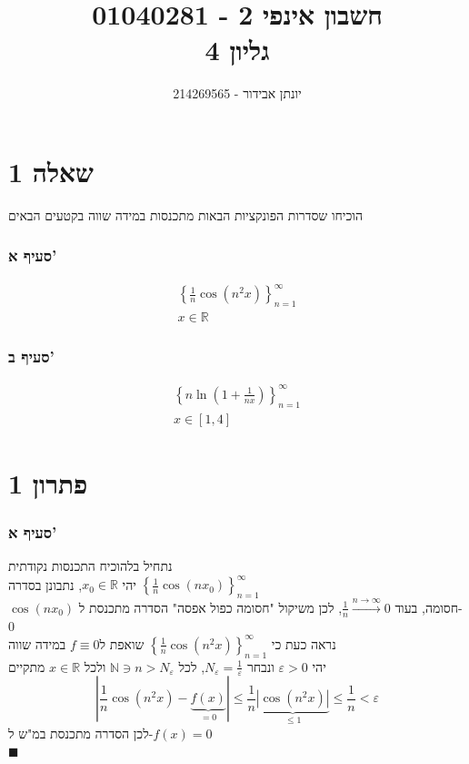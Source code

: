 \documentclass[12pt, titlepage]{article}
\title{חשבון אינפי 2 - 01040281 \\ גליון 4}
\author{יונתן אבידור - 214269565}
\begin{document}
\maketitle
\pagestyle{fancy}
\fancyhead{}
\part*{שאלה 1}
הוכיחו שסדרות הפונקציות הבאות מתכנסות במידה שווה בקטעים הבאים
\section*{סעיף א'}
\begin{gather*} \left\{\frac{1}{n} \cos \left(n^2x\right) \right\}^\infty_{n=1}\\
    x \in \mathbb{R}
\end{gather*}
\section*{סעיף ב'}
\begin{gather*}
    \left\{n\ln \left(1+\frac{1}{nx}\right)\right\}^\infty_{n=1}\\
    x\in\left[1,4\right]
\end{gather*}
\part*{פתרון 1}
\section*{סעיף א'}
נתחיל בלהוכיח התכנסות נקודתית\\
יהי $x_0 \in \mathbb{R}$, נתבונן בסדרה $\left\{\frac{1}{n} \cos\left(n x_0\right)\right\}_{n=1}^{\infty}$ \\
$\cos\left(n x_0\right)$ חסומה, בעוד $\frac{1}{n} \xrightarrow{n\to\infty}0$, לכן משיקול "חסומה כפול אפסה" הסדרה מתכנסת ל-$0$\\
נראה כעת כי $\left\{\frac{1}{n} \cos \left(n^2x\right) \right\}^\infty_{n=1}$ שואפת ל$f \equiv 0$ במידה שווה \\
יהי $\varepsilon > 0$ ונבחר $N_{\varepsilon} = \frac{1}{\varepsilon}$, לכל $\mathbb{N} \ni n > N_{\varepsilon}$ ולכל $x \in \mathbb{R}$ מתקיים
\[
\left|\frac{1}{n}\cos\left(n^2 x\right) - \underbrace{f\left(x\right)}_{= 0} \right| \leq \frac{1}{n} \underbrace{\left|\cos\left(n^2x\right)\right|}_{\leq 1}\leq \frac{1}{n} < \varepsilon
\]
לכן הסדרה מתכנסת במ"ש ל-$f\left(x\right) = 0$\\
$\blacksquare$
\end{document}
